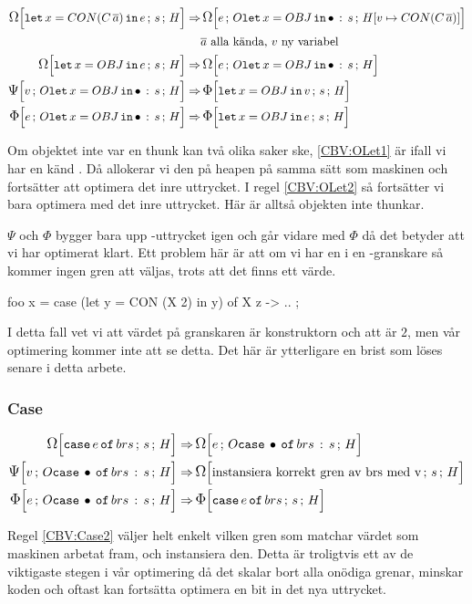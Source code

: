 \documentclass[../Optimise]{subfiles}
\begin{document}
\begin{align}
\label{CBV:OLet1} \OMEGA sH{\eLet x{\CON{C}{\many{a}}}{e}}  \Rightarrow &\, \OMEGA{\oLetObj x{OBJ}s}{\heap{v}{\CON{C}{\many{a}}}}e\\
 & \many{a} \text{ alla kända, } v \text{ ny variabel} \nonumber \\
\label{CBV:OLet2}\OMEGA sH{\eLet x{OBJ}{e}}  \Rightarrow &\, \OMEGA{\oLetObj x{OBJ}s}He\\
\PSI{\oLetObj x{OBJ}s}Hv  \Rightarrow &\, \IRR sH{\eLet x{OBJ}v}\\
\IRR{\oLetObj x{OBJ}s}He  \Rightarrow &\, \IRR sH{\eLet x{OBJ}e}
\end{align}

Om objektet inte var en thunk kan två olika saker ske, \eqref{CBV:OLet1} är ifall 
vi har en känd . Då allokerar vi den på heapen på samma sätt som maskinen
och fortsätter att optimera det inre uttrycket. I regel \eqref{CBV:OLet2} så 
fortsätter vi bara optimera med det inre uttrycket. Här är alltså objekten
inte thunkar.

$\Psi$ och $\Phi$ bygger bara upp -uttrycket igen och går vidare med $\Phi$
då det betyder att vi har optimerat klart. Ett problem här är att om vi har en 
i en -granskare så kommer ingen gren att väljas, trots att det finns ett värde.

\begin{codeEx}
foo x = case (let y = CON (X 2) in y) of
    { X z -> ..
    };
\end{codeEx} 

I detta fall vet vi att värdet på granskaren är konstruktorn  och att  är $2$, men vår optimering
kommer inte att se detta. Det här är ytterligare en brist som löses senare i detta arbete.

\subsubsection{Case}
\label{cbv:case}
\begin{align}
\OMEGA sH{\eCase e{brs}} \Rightarrow &\, \OMEGA{\oCase{brs}s}He\\
\label{CBV:Case2} \PSI{\oCase{brs}s}Hv \Rightarrow &\, \OMEGA sH{\text{instansiera korrekt gren av brs med v}} \\
\label{CBV:Case3} \IRR{\oCase{brs}s}He \Rightarrow &\, \IRR sH{\eCase e brs}
\end{align}

Regel \eqref{CBV:Case2} väljer helt enkelt vilken gren som matchar
värdet som maskinen arbetat fram, och instansiera den. Detta är troligtvis ett
av de viktigaste stegen i vår optimering då det skalar bort alla onödiga 
grenar, minskar koden och oftast kan fortsätta optimera en bit in det nya uttrycket.
\end{document}
